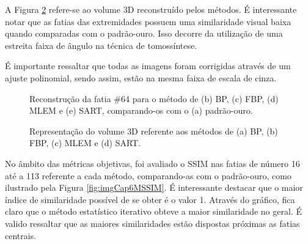  A Figura \ref{fig:imgCap6SheppLogan3D_Recons} refere-se ao volume \acs{3D} reconstruído pelos métodos. É interessante notar que as fatias das extremidades possuem uma similaridade visual baixa quando comparadas com o padrão-ouro. Isso decorre da utilização de uma estreita faixa de ângulo na técnica de tomossíntese.
 
 É importante ressaltar que todas as imagens foram corrigidas através de um ajuste polinomial, sendo assim, estão na mesma faixa de escala de cinza.
    
 \begin{figure}[!h]
 	\centering	
 	\caption{Reconstrução da fatia \#64 para o método de (b) \acs{BP}, (c) \acs{FBP}, (d) \acs{MLEM} e (e) \acs{SART}, comparando-os com o (a) padrão-ouro.}
 	\hfill
 	\hfill
 	\hfill
 	\hfill
 	\label{fig:imgCap6SheppLogan}
 \end{figure}

\begin{figure}[!h]
	\caption{Representação do volume \acs{3D} referente aos métodos de (a) \acs{BP}, (b) \acs{FBP}, (c) \acs{MLEM} e (d) \acs{SART}.}
 	\centering	
	\hfill
	\hfill
	\hfill
	\label{fig:imgCap6SheppLogan3D_Recons}
\end{figure}

No âmbito das métricas objetivas, foi avaliado o \acs{SSIM} nas fatias de número 16 até a 113 referente a cada método, comparando-as com o padrão-ouro, como ilustrado pela Figura \ref{fig:imgCap6MSSIM}. É interessante destacar que o maior índice de similaridade possível de se obter é o valor 1. Através do gráfico, fica claro que o método estatístico iterativo obteve a maior similaridade no geral. É valido ressaltar que as maiores similaridades estão dispostas próximas as fatias centrais.

